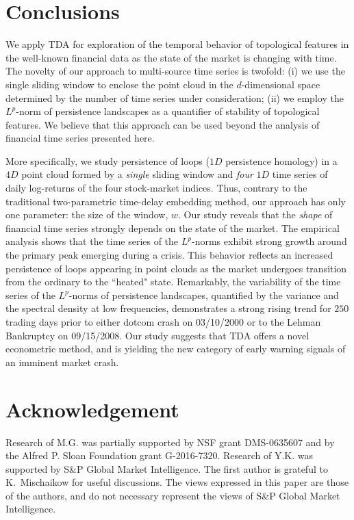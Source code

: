 \documentclass[preprint,12pt]{elsarticle}
\theoremstyle{definition}
\theoremstyle{remark}
\numberwithin{equation}{section}
\theoremstyle{definition}
\begin{document}
\section{Conclusions}\label{sec:conclusions}
We apply TDA for exploration of the temporal behavior of topological features in the well-known financial data as the state of the market is changing with time. The novelty of our approach to multi-source time series is twofold: (i) we use the single sliding window to enclose the point cloud in the $d$-dimensional space determined by the number of time series under consideration; (ii) we employ the  $L^p$-norm of persistence landscapes as a quantifier of stability of topological features. We believe that this approach can be used beyond the analysis of financial time series presented here.

More specifically, we study persistence of loops ($1D$ persistence homology) in a $4D$ point cloud formed by a \emph{single} sliding window and \emph{four} $1D$ time series of daily log-returns of the four stock-market indices. Thus, contrary to the traditional two-parametric time-delay embedding method, our approach has only one parameter: the size of the window, $w$. Our study reveals that the \emph{shape} of financial time series strongly depends on the state of the market. The empirical analysis shows that the time series of the $L^p$-norms exhibit strong growth around the primary peak emerging during a crisis. This behavior reflects an increased persistence of loops appearing in point clouds as the market undergoes transition from the ordinary to the ``heated" state. Remarkably, the variability of the time series of the  $L^p$-norms of persistence landscapes, quantified by the variance and the spectral density at low frequencies, demonstrates a strong rising trend for $250$ trading days prior to either dotcom crash on 03/10/2000 or to the Lehman Bankruptcy on 09/15/2008. Our study suggests that TDA offers a  novel econometric method, and is yielding the new category of early warning signals of an imminent market crash.




\section{Acknowledgement}
Research of M.G. was partially supported by NSF grant  DMS-0635607 and by the  Alfred P. Sloan Foundation grant G-2016-7320. Research of Y.K. was supported by S\&P Global Market Intelligence. The first author is grateful  to  K.~Mischaikow for useful discussions.
The views expressed in this paper are those of the authors, and do not necessary represent the views of S\&P Global Market Intelligence.
\end{document}
